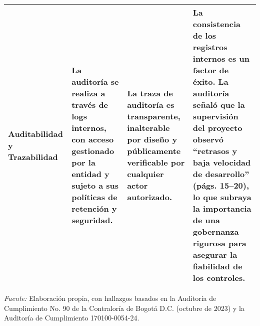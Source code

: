 \begin{table}[htbp]
\begin{tabular}{p{3.5cm} p{5.5cm} p{5.5cm} p{3.5cm}}
        \midrule
        \textbf{Auditabilidad y Trazabilidad} & La auditoría se realiza a través de logs internos, con acceso gestionado por la entidad y sujeto a sus políticas de retención y seguridad. & La traza de auditoría es transparente, inalterable por diseño y públicamente verificable por cualquier actor autorizado. & La consistencia de los registros internos es un factor de éxito. La auditoría señaló que la supervisión del proyecto observó ``retrasos y baja velocidad de desarrollo'' (págs. 15--20), lo que subraya la importancia de una gobernanza rigurosa para asegurar la fiabilidad de los controles. \\
        \bottomrule
    \end{tabular}
    \vspace{2em}
    \begin{flushleft}
        \textit{Fuente:} Elaboración propia, con hallazgos basados en la Auditoría de Cumplimiento No. 90 de la Contraloría de Bogotá D.C. (octubre de 2023) y la Auditoría de Cumplimiento 170100-0054-24.
    \end{flushleft}
    \label{tab:comparacion_modelos}
\end{table}

